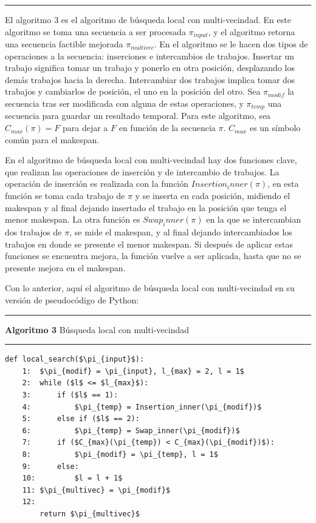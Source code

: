 \documentclass{article}
\begin{document}
\noindent\noindent
\rule{\linewidth}{0.4pt}

\vspace{\baselineskip}
El algoritmo 3 es el algoritmo de búsqueda local con multi-vecindad. En este
algoritmo se toma una secuencia a ser procesada $\pi_{input}$, y el algoritmo
retorna una secuencia factible mejorada $\pi_{multivec}$. En el algoritmo se
le hacen dos tipos de operaciones a la secuencia: inserciones e intercambios
de trabajos. Insertar un trabajo significa tomar un trabajo y ponerlo en otra
posición, desplazando los demás trabajos hacia la derecha. Intercambiar dos
trabajos implica tomar dos trabajos y cambiarlos de posición, el uno en la
posición del otro. Sea $\pi_{modif}$ la secuencia tras ser modificada con alguna
de estas operaciones, y $\pi_{temp}$ una secuencia para guardar un resultado
temporal. Para este algoritmo, sea $C_{max}(\pi) = F$ para dejar
a $F$ en función de la secuencia $\pi$. $C_{max}$ es un símbolo común
para el makespan. \autocite{algMNIG}

\vspace{\baselineskip}
En el algoritmo de búsqueda local con multi-vecindad hay dos funciones clave, que
realizan las operaciones de inserción y de intercambio de trabajos. La operación de
inserción es realizada con la función $Insertion_inner(\pi)$, en esta función se
toma cada trabajo de $\pi$ y se inserta en cada posición, midiendo el makespan y al
final dejando insertado el trabajo en la posición que tenga el menor makespan. La
otra función es $Swap_inner(\pi)$ en la que se intercambian dos trabajos de $\pi$,
se mide el makespan, y al final dejando intercambiados los trabajos en donde se
presente el menor makespan. Si después de aplicar estas funciones se encuentra 
mejora, la función vuelve a ser aplicada, hasta que no se presente mejora en 
el makespan. \autocite{algMNIG}

\vspace{\baselineskip}
Con lo anterior, aquí el algoritmo de búsqueda local con multi-vecindad en
su versión de pseudocódigo de Python:

\noindent\noindent
\rule{\linewidth}{0.4pt}

\textbf{Algoritmo 3} Búsqueda local con multi-vecindad

\noindent\noindent
\rule{\linewidth}{0.4pt}

\begin{lstlisting}[mathescape=true]
    def local_search($\pi_{input}$):
    1:  $\pi_{modif} = \pi_{input}, l_{max} = 2, l = 1$
    2:  while ($l$ <= $l_{max}$):
    3:      if ($l$ == 1):
    4:          $\pi_{temp} = Insertion_inner(\pi_{modif})$
    5:      else if ($l$ == 2):
    6:          $\pi_{temp} = Swap_inner(\pi_{modif})$
    7:      if ($C_{max}(\pi_{temp}) < C_{max}(\pi_{modif})$):
    8:          $\pi_{modif} = \pi_{temp}, l = 1$
    9:      else:
    10:         $l = l + 1$
    11: $\pi_{multivec} = \pi_{modif}$
    12:
        return $\pi_{multivec}$
\end{lstlisting}
\end{document}
